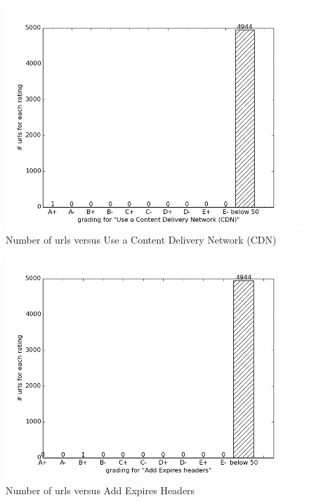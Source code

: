 \documentclass[conference]{IEEEtran}
\begin{document}
\begin{figure}[ht]
 \centering
  \includegraphics[scale=0.33]{new-img-jpg/vlab-jpg/Use a Content Delivery Network (CDN).jpg}
\caption{Number of urls versus Use a Content Delivery Network (CDN)}	
\label{fig:usecdn}
\end{figure}        

\begin{figure}[ht]
 \centering
  \includegraphics[scale=0.33]{new-img-jpg/vlab-jpg/Add Expires headers.jpg}
\caption{Number of urls versus Add Expires Headers}	
\label{fig:add-eh}
\end{figure}
\end{document}
